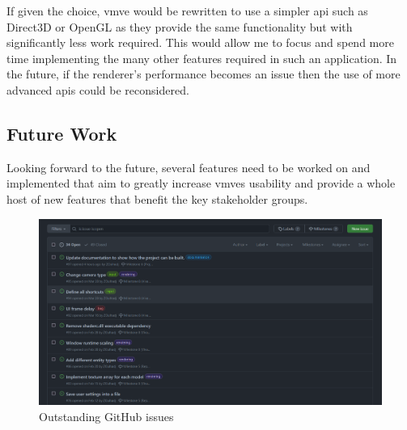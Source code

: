 \documentclass[11pt]{article}
\begin{document}
If given the choice, \gls*{vmve} would be rewritten to use a simpler \gls*{api}
such as Direct3D or OpenGL as they provide the same functionality but with
significantly less work required. This would allow me to focus and spend more
time implementing the many other features required in such an application. In
the future, if the renderer's performance becomes an issue then the use of more
advanced \glspl*{api} could be reconsidered.


\subsection{Future Work} \label{future_work} 
Looking forward to the future, several features need to be worked on and
implemented that aim to greatly increase \glspl*{vmve} usability and provide a
whole host of new features that benefit the key stakeholder groups.

\begin{figure}[H]
  \centering
  \includegraphics[width=\textwidth]{images/github_issues.png}
  \caption{Outstanding GitHub issues}
  \label{fig:github_issues}
\end{figure}
\end{document}

